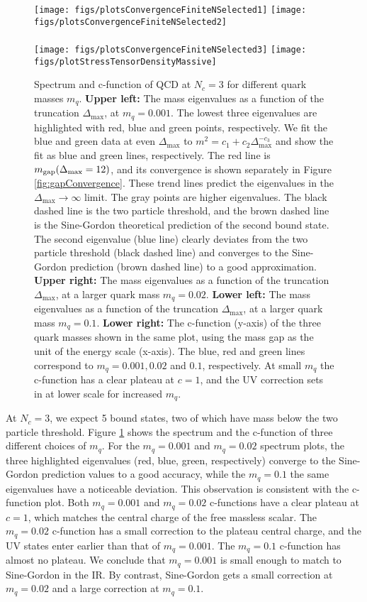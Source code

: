 \documentclass[12pt]{article}
\newcommand\De\Delta
\newcommand{\Dmax}{\De_{\max}}
\newcommand{\Nc}{N_c}
\begin{document}
\begin{figure}[htbp]
\centering
\texttt{[image: figs/plotsConvergenceFiniteNSelected1]}
\texttt{[image: figs/plotsConvergenceFiniteNSelected2]}\\ ~\\
\texttt{[image: figs/plotsConvergenceFiniteNSelected3]}
\texttt{[image: figs/plotStressTensorDensityMassive]}
\caption{
    \label{fig:massiveDataCollection}
    Spectrum and c-function of QCD at $\Nc=3$ for different quark masses $m_q$. 
    {\bf Upper left: } The mass eigenvalues as a function of the truncation $\Dmax$, at $m_q=0.001$. The lowest three eigenvalues are highlighted with red, blue and green points, respectively. 
    We fit the blue and green data at even $\Dmax$ to $m^2 = c_1 + c_2 \Dmax^{-c_3}$ and show the fit as blue and green lines, respectively. The red line is $m_{\rm gap}(\Dmax = 12)$, and its convergence is shown separately in Figure \ref{fig:gapConvergence}.
    These trend lines predict the eigenvalues in the $\Dmax\rightarrow \infty$ limit. 
    The gray points are higher eigenvalues. The black dashed line is the two particle threshold, and the brown dashed line is the Sine-Gordon theoretical prediction of the second bound state. The second eigenvalue (blue line) clearly deviates from the two particle threshold (black dashed line) and converges to the Sine-Gordon prediction (brown dashed line) to a good approximation.
    {\bf Upper right: } The mass eigenvalues as a function of the truncation $\Dmax$, at a larger quark mass $m_q=0.02$.
    {\bf Lower left: } The mass eigenvalues as a function of the truncation $\Dmax$, at a larger quark mass $m_q=0.1$.
    {\bf Lower right: } The c-function (y-axis) of the three quark masses shown in the same plot, using the mass gap as the unit of the energy scale (x-axis). The blue, red and green lines correspond to $m_q = 0.001, 0.02$ and $0.1$, respectively. At small $m_q$ the c-function has a clear plateau at $c=1$, and the UV correction sets in at lower scale for increased $m_q$.
}
\end{figure}


At $\Nc=3$, we expect 5 bound states, two of which have mass below the two particle threshold. Figure \ref{fig:massiveDataCollection} shows the spectrum and the c-function of three different choices of $m_q$. For the $m_q=0.001$ and $m_q=0.02$ spectrum plots, the three highlighted eigenvalues (red, blue, green, respectively) converge to the Sine-Gordon prediction values to a good accuracy, while the $m_q=0.1$ the same eigenvalues have a noticeable deviation. This observation is consistent with the c-function plot. Both $m_q=0.001$ and $m_q=0.02$ c-functions have a clear plateau at $c=1$, which matches the central charge of the free massless scalar. The $m_q=0.02$ c-function has a small correction to the plateau central charge, and the UV states enter earlier than that of $m_q=0.001$. The $m_q=0.1$ c-function has almost no plateau. We conclude that $m_q=0.001$ is small enough to match to Sine-Gordon in the IR. By contrast, Sine-Gordon gets a small correction at $m_q=0.02$ and a large correction at $m_q=0.1$. 
\end{document}
